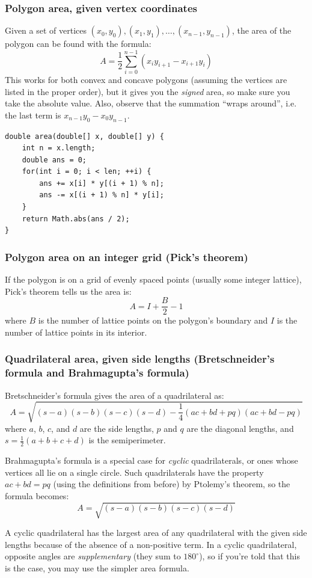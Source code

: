 \documentclass[a4paper,12pt]{article}
\begin{document}
\subsubsection{Polygon area, given vertex coordinates}
\noindent Given a set of vertices $(x_0, y_0), (x_1, y_1), \dots, (x_{n-1}, y_{n-1})$, the area of the polygon can be found with the formula:
\[A=\frac{1}{2}\sum_{i=0}^{n-1}\left(x_i y_{i+1}-x_{i+1} y_i\right)\]
This works for both convex and concave polygons (assuming the vertices are listed in the proper order), but it gives you the {\em signed} area, so make sure you take the absolute value. Also, observe that the summation ``wraps around'', i.e. the last term is $x_{n-1} y_0-x_0 y_{n-1}$.
\begin{lstlisting}
double area(double[] x, double[] y) {
	int n = x.length;
	double ans = 0;
	for(int i = 0; i < len; ++i) {
		ans += x[i] * y[(i + 1) % n];
		ans -= x[(i + 1) % n] * y[i];
	}
	return Math.abs(ans / 2);
}
\end{lstlisting}

\subsubsection{Polygon area on an integer grid (Pick's theorem)}
\noindent If the polygon is on a grid of evenly spaced points (usually some integer lattice), Pick's theorem tells us the area is:
\[A=I+\frac{B}{2}-1\]
where $B$ is the number of lattice points on the polygon's boundary and $I$ is the number of lattice points in its interior.

\subsubsection{Quadrilateral area, given side lengths (Bretschneider's formula and Brahmagupta's formula)}
Bretschneider's formula gives the area of a quadrilateral as:
\[A=\sqrt{(s-a)(s-b)(s-c)(s-d)-\frac{1}{4}(ac+bd+pq)(ac+bd-pq)}\]
\noindent where $a$, $b$, $c$, and $d$ are the side lengths, $p$ and $q$ are the diagonal lengths, and $s=\frac{1}{2}\left(a+b+c+d\right)$ is the semiperimeter.

Brahmagupta's formula is a special case for {\em cyclic} quadrilaterals, or ones whose vertices all lie on a single circle. Such quadrilaterals have the property $ac+bd=pq$ (using the definitions from before) by Ptolemy's theorem, so the formula becomes:
\[A=\sqrt{(s-a)(s-b)(s-c)(s-d)}\]

A cyclic quadrilateral has the largest area of any quadrilateral with the given side lengths because of the absence of a non-positive term. In a cyclic quadrilateral, opposite angles are {\em  supplementary} (they sum to $180^{\circ}$), so if you're told that this is the case, you may use the simpler area formula.
\end{document}
